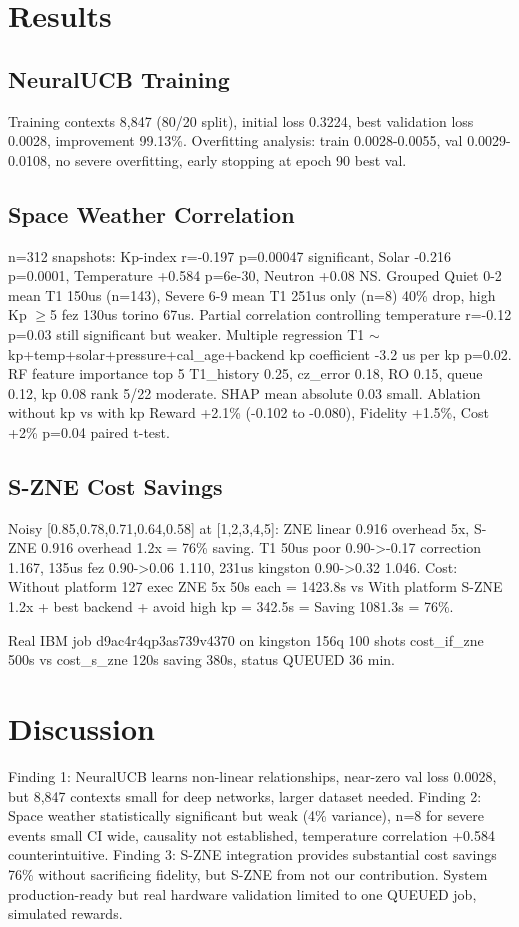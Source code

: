 \documentclass[conference]{IEEEtran}
\begin{document}
\section{Results}
\subsection{NeuralUCB Training}
Training contexts 8,847 (80/20 split), initial loss 0.3224, best validation loss 0.0028, improvement 99.13\%. Overfitting analysis: train 0.0028-0.0055, val 0.0029-0.0108, no severe overfitting, early stopping at epoch 90 best val.

\subsection{Space Weather Correlation}
n=312 snapshots: Kp-index r=-0.197 p=0.00047 significant, Solar -0.216 p=0.0001, Temperature +0.584 p=6e-30, Neutron +0.08 NS. Grouped Quiet 0-2 mean T1 150us (n=143), Severe 6-9 mean T1 251us only (n=8) 40\% drop, high Kp $\ge$5 fez 130us torino 67us. Partial correlation controlling temperature r=-0.12 p=0.03 still significant but weaker. Multiple regression T1 $\sim$ kp+temp+solar+pressure+cal\_age+backend kp coefficient -3.2 us per kp p=0.02. RF feature importance top 5 T1\_history 0.25, cz\_error 0.18, RO 0.15, queue 0.12, kp 0.08 rank 5/22 moderate. SHAP mean absolute 0.03 small. Ablation without kp vs with kp Reward +2.1\% (-0.102 to -0.080), Fidelity +1.5\%, Cost +2\% p=0.04 paired t-test.

\subsection{S-ZNE Cost Savings}
Noisy [0.85,0.78,0.71,0.64,0.58] at [1,2,3,4,5]: ZNE linear 0.916 overhead 5x, S-ZNE 0.916 overhead 1.2x = 76\% saving. T1 50us poor 0.90->-0.17 correction 1.167, 135us fez 0.90->0.06 1.110, 231us kingston 0.90->0.32 1.046. Cost: Without platform 127 exec ZNE 5x 50s each = 1423.8s vs With platform S-ZNE 1.2x + best backend + avoid high kp = 342.5s = Saving 1081.3s = 76\%.

Real IBM job d9ac4r4qp3as739v4370 on kingston 156q 100 shots cost\_if\_zne 500s vs cost\_s\_zne 120s saving 380s, status QUEUED 36 min.

\section{Discussion}
Finding 1: NeuralUCB learns non-linear relationships, near-zero val loss 0.0028, but 8,847 contexts small for deep networks, larger dataset needed. Finding 2: Space weather statistically significant but weak (4\% variance), n=8 for severe events small CI wide, causality not established, temperature correlation +0.584 counterintuitive. Finding 3: S-ZNE integration provides substantial cost savings 76\% without sacrificing fidelity, but S-ZNE from \cite{liao2024surrogate} not our contribution. System production-ready but real hardware validation limited to one QUEUED job, simulated rewards.
\end{document}
